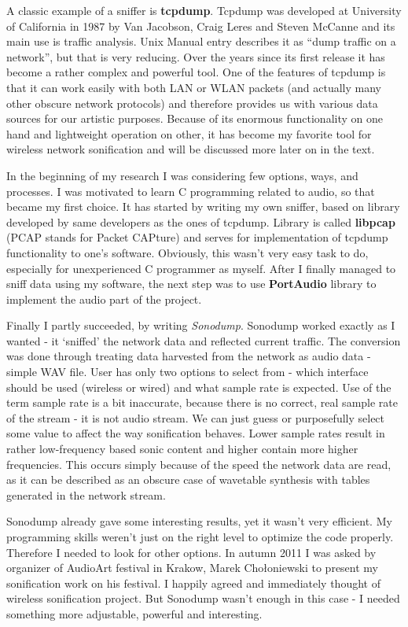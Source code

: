 \documentclass[12pt,a4paper,oneside]{report}
\begin{document}
A classic example of a sniffer is \textbf{tcpdump}. Tcpdump was developed at University of California in 1987 by Van Jacobson, Craig Leres and Steven McCanne and its main use is traffic analysis. Unix Manual entry describes it as ``dump traffic on a network'', but that is very reducing. Over the years since its first release it has become a rather complex and powerful tool. One of the features of tcpdump is that it can work easily with both LAN or WLAN packets (and actually many other obscure network protocols) and therefore provides us with various data sources for our artistic purposes. Because of its enormous functionality on one hand and lightweight operation on other, it has become my favorite tool for wireless network sonification and will be discussed more later on in the text.

In the beginning of my research I was considering few options, ways, and processes. I was motivated to learn C programming related to audio, so that became my first choice. It has started by writing my own sniffer, based on library developed by same developers as the ones of tcpdump. Library is called \textbf{libpcap} (PCAP stands for Packet CAPture) and serves for implementation of tcpdump functionality to one's software. Obviously, this wasn't very easy task to do, especially for unexperienced C programmer as myself. After I finally managed to sniff data using my software, the next step was to use \textbf{PortAudio} library to implement the audio part of the project.

Finally I partly succeeded, by writing \emph{Sonodump}. Sonodump worked exactly as I wanted - it `sniffed' the network data and reflected current traffic. The conversion was done through treating data harvested from the network as audio data - simple WAV file. User has only two options to select from - which interface should be used (wireless or wired) and what sample rate is expected. Use of the term sample rate is a bit inaccurate, because there is no correct, real sample rate of the stream - it is not audio stream. We can just guess or purposefully select some value to affect the way sonification behaves. Lower sample rates result in rather low-frequency based sonic content and higher contain more higher frequencies. This occurs simply because of the speed the network data are read, as it can be described as an obscure case of wavetable synthesis with tables generated in the network stream.

Sonodump already gave some interesting results, yet it wasn't very efficient. My programming skills weren't just on the right level to optimize the code properly. Therefore I needed to look for other options. In autumn 2011 I was asked by organizer of AudioArt festival in Krakow, Marek Chołoniewski to present my sonification work on his festival. I happily agreed and immediately thought of wireless sonification project. But Sonodump wasn't enough in this case - I needed something more adjustable, powerful and interesting.
\end{document}

